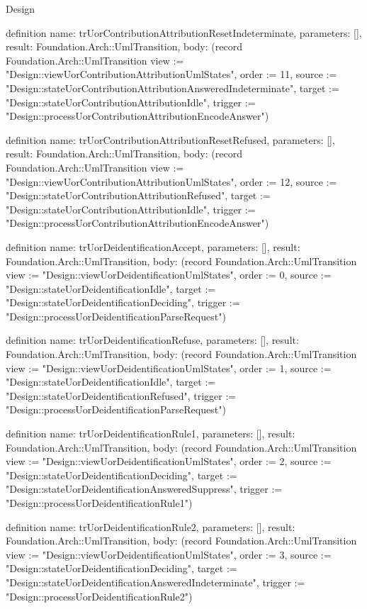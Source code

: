 \begin{lexlean}{Design}
\begin{semanticmodule}
definition{
  name: trUorContributionAttributionResetIndeterminate,
  parameters: [],
  result: Foundation.Arch::UmlTransition,
  body: (record Foundation.Arch::UmlTransition {view := "Design::viewUorContributionAttributionUmlStates", order := 11, source := "Design::stateUorContributionAttributionAnsweredIndeterminate", target := "Design::stateUorContributionAttributionIdle", trigger := "Design::processUorContributionAttributionEncodeAnswer"})
}

definition{
  name: trUorContributionAttributionResetRefused,
  parameters: [],
  result: Foundation.Arch::UmlTransition,
  body: (record Foundation.Arch::UmlTransition {view := "Design::viewUorContributionAttributionUmlStates", order := 12, source := "Design::stateUorContributionAttributionRefused", target := "Design::stateUorContributionAttributionIdle", trigger := "Design::processUorContributionAttributionEncodeAnswer"})
}

definition{
  name: trUorDeidentificationAccept,
  parameters: [],
  result: Foundation.Arch::UmlTransition,
  body: (record Foundation.Arch::UmlTransition {view := "Design::viewUorDeidentificationUmlStates", order := 0, source := "Design::stateUorDeidentificationIdle", target := "Design::stateUorDeidentificationDeciding", trigger := "Design::processUorDeidentificationParseRequest"})
}

definition{
  name: trUorDeidentificationRefuse,
  parameters: [],
  result: Foundation.Arch::UmlTransition,
  body: (record Foundation.Arch::UmlTransition {view := "Design::viewUorDeidentificationUmlStates", order := 1, source := "Design::stateUorDeidentificationIdle", target := "Design::stateUorDeidentificationRefused", trigger := "Design::processUorDeidentificationParseRequest"})
}

definition{
  name: trUorDeidentificationRule1,
  parameters: [],
  result: Foundation.Arch::UmlTransition,
  body: (record Foundation.Arch::UmlTransition {view := "Design::viewUorDeidentificationUmlStates", order := 2, source := "Design::stateUorDeidentificationDeciding", target := "Design::stateUorDeidentificationAnsweredSuppress", trigger := "Design::processUorDeidentificationRule1"})
}

definition{
  name: trUorDeidentificationRule2,
  parameters: [],
  result: Foundation.Arch::UmlTransition,
  body: (record Foundation.Arch::UmlTransition {view := "Design::viewUorDeidentificationUmlStates", order := 3, source := "Design::stateUorDeidentificationDeciding", target := "Design::stateUorDeidentificationAnsweredIndeterminate", trigger := "Design::processUorDeidentificationRule2"})
}


\end{semanticmodule}
\end{lexlean}
